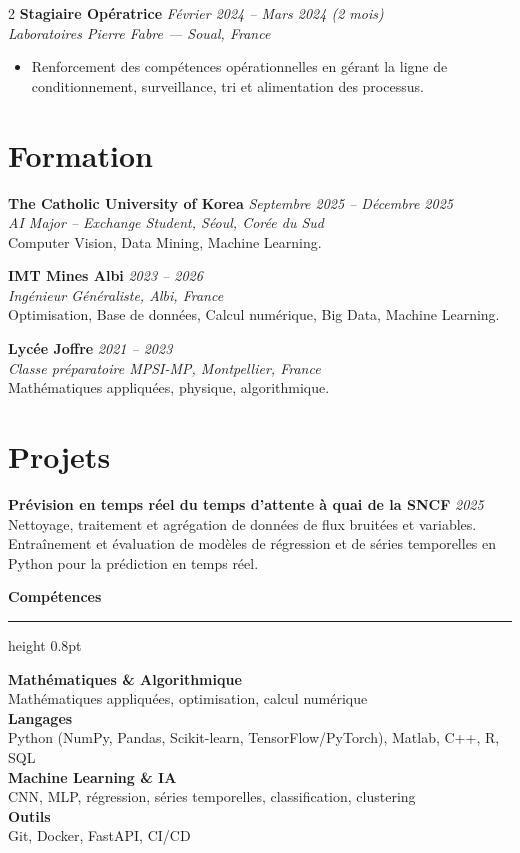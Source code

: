 \documentclass[10.5pt,a4paper]{article}
\newcommand{\sectionrule}{\vspace{-6pt}{\color{accent}\hrule height 1pt}\vspace{3pt}}
\newcommand{\subsectitle}[1]{%
  {\color{accent}\bfseries\large #1}\\[-2pt]
  {\color{accent}\hrule height 0.8pt}\vspace{5pt}
}
\newcommand{\cvexp}[5]{%
  \noindent\textbf{#1} \hfill {\itshape\color{graytext}\small #4}\\
  {\itshape #2 --- #3}\\[-2pt]
  #5
  \vspace{4pt}
}
\newcommand{\cvedu}[5]{%
  \noindent\textbf{#1} \hfill {\itshape\color{graytext}\small #4}\\
  {\itshape #2, #3}\\[1pt]
  {\small #5}
  \vspace{3pt}
}
\newcommand{\cvproject}[3]{%
  \noindent\textbf{#1} \hfill {\itshape\color{graytext}\small #2}\\[1pt]
  {\small #3}
  \vspace{3pt}
}
\newcommand{\sidebarline}[2]{%
  \noindent\textbf{\small #1}\\
  {\small #2}\\[3pt]
}
\begin{document}
\begin{paracol}{2}
\cvexp{Stagiaire Opératrice}{Laboratoires Pierre Fabre}{Soual, France}{Février 2024 -- Mars 2024 (2 mois)}{%
  \begin{itemize}[leftmargin=12pt, itemsep=2pt, topsep=0pt, partopsep=0pt, parsep=0pt]
    \item Renforcement des compétences opérationnelles en gérant la ligne de conditionnement, surveillance, tri et alimentation des processus.
  \end{itemize}
}

\section*{Formation}
\sectionrule

\cvedu{The Catholic University of Korea}{AI Major -- Exchange Student}{Séoul, Corée du Sud}{Septembre 2025 -- Décembre 2025}{Computer Vision, Data Mining, Machine Learning.}

\cvedu{IMT Mines Albi}{Ingénieur Généraliste}{Albi, France}{2023 -- 2026}{Optimisation, Base de données, Calcul numérique, Big Data, Machine Learning.}

\cvedu{Lycée Joffre}{Classe préparatoire MPSI-MP}{Montpellier, France}{2021 -- 2023}{Mathématiques appliquées, physique, algorithmique.}

\section*{Projets}
\sectionrule

\cvproject{Prévision en temps réel du temps d'attente à quai de la SNCF}{2025}{Nettoyage, traitement et agrégation de données de flux bruitées et variables. Entraînement et évaluation de modèles de régression et de séries temporelles en Python pour la prédiction en temps réel.}

\switchcolumn

\vspace{2pt}

\subsectitle{Compétences}

\sidebarline{Mathématiques \& Algorithmique}{Mathématiques appliquées, optimisation, calcul numérique}
\sidebarline{Langages}{Python (NumPy, Pandas, Scikit-learn, TensorFlow/\allowbreak PyTorch), Matlab, C++, R, SQL}
\sidebarline{Machine Learning \& IA}{CNN, MLP, régression, séries temporelles, classification, clustering}
\sidebarline{Outils}{Git, Docker, FastAPI, CI/CD}


\end{paracol}
\end{document}
